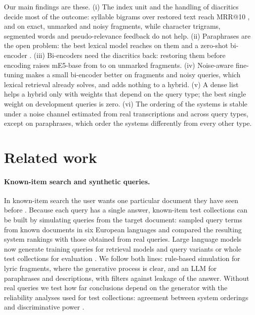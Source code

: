 \documentclass[11pt]{article}
\makeatletter
\newcommand{\mrr}{MRR@10\xspace}
\makeatother
\begin{document}
\noindent Our main findings are these. (i) The index unit and the handling of diacritics decide most of the
outcome: syllable bigrams over restored text reach \mrr{} \MRestAllBiOne, \MRestAllBiTwo{} and
\MRestAllBiThree{} on exact, unmarked and noisy fragments, while character trigrams, segmented words and
pseudo-relevance feedback do not help. (ii) Paraphrases are the open problem: the best lexical model reaches
\BestLexQfour{} on them and a zero-shot bi-encoder \MDenseEbaseFour. (iii) Bi-encoders need the diacritics
back: restoring them before encoding raises mE5-base from \MDenseEbaseTwo{} to \MDenseEbaseRestTwo{} on
unmarked fragments. (iv) Noise-aware fine-tuning makes a small bi-encoder better on fragments and noisy
queries, which lexical retrieval already solves, and adds nothing to a hybrid. (v) A dense list helps a hybrid
only with weights that depend on the query type; the best single weight on development queries is zero.
(vi) The ordering of the systems is stable under a noise channel estimated from real transcriptions and
across query types, except on paraphrases, which order the systems differently from every other type.

\section{Related work}

\paragraph{Known-item search and synthetic queries.}
In known-item search the user wants one particular document they have seen before
\citep{ogilvie2003known}. Because each query has a single answer, known-item test collections can be built by
simulating queries from the target document: \citet{azzopardi2007simulated} sampled query terms from
known documents in six European languages and compared the resulting system rankings with those obtained
from real queries. Large language models now generate training queries for retrieval models
\citep{bonifacio2022inpars} and query variants or whole test collections for evaluation
\citep{alaofi2023variants,rahmani2024synthetic}. We follow both lines: rule-based simulation for lyric
fragments, where the generative process is clear, and an LLM for paraphrases and descriptions, with filters
against leakage of the answer. Without real queries we test how far conclusions depend on the generator
with the reliability analyses used for test collections: agreement between system orderings
\citep{voorhees2000variations} and discriminative power \citep{sakai2006bootstrap}.
\end{document}
